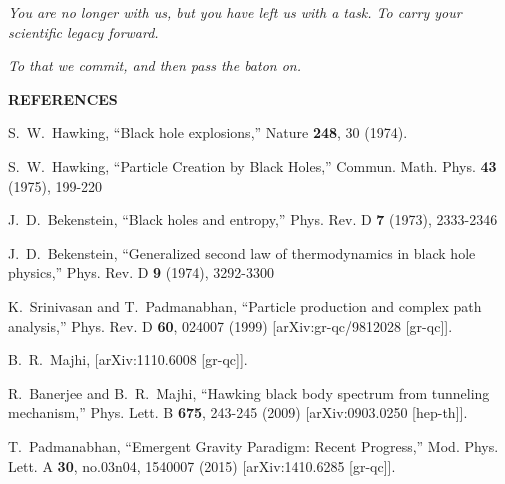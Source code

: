 \documentclass[prd, preprint, longbibliography, 12pt]{revtex4-2}
\begin{document}
\medskip



\centerline{\it You are no longer with us, but you have left us with a task. To carry  your scientific legacy forward.}
\centerline{\it To that we commit, and then pass the baton on.}

\bigskip



\bigskip


\newpage

\centerline{\bf REFERENCES}

\begin{thebibliography}{9}
S.~W.~Hawking,
``Black hole explosions,''
Nature {\bf 248}, 30 (1974).

S.~W.~Hawking,
``Particle Creation by Black Holes,''
Commun. Math. Phys. \textbf{43} (1975), 199-220

J.~D.~Bekenstein,
``Black holes and entropy,''
Phys. Rev. D \textbf{7} (1973), 2333-2346

J.~D.~Bekenstein,
``Generalized second law of thermodynamics in black hole physics,''
Phys. Rev. D \textbf{9} (1974), 3292-3300

K.~Srinivasan and T.~Padmanabhan,
``Particle production and complex path analysis,''
Phys. Rev. D \textbf{60}, 024007 (1999)
[arXiv:gr-qc/9812028 [gr-qc]].

B.~R.~Majhi,
[arXiv:1110.6008 [gr-qc]].

R.~Banerjee and B.~R.~Majhi,
``Hawking black body spectrum from tunneling mechanism,''
Phys. Lett. B \textbf{675}, 243-245 (2009)
[arXiv:0903.0250 [hep-th]].

T.~Padmanabhan,
``Emergent Gravity Paradigm: Recent Progress,''
Mod. Phys. Lett. A \textbf{30}, no.03n04, 1540007 (2015)
[arXiv:1410.6285 [gr-qc]].


\end{thebibliography}
\end{document}
